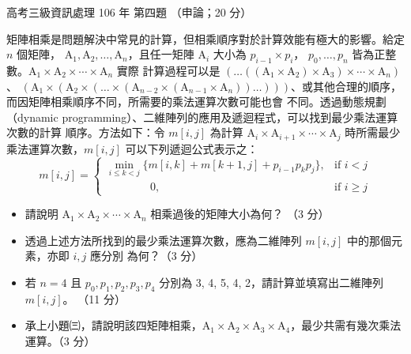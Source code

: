\begin{pastexam}[label={px:gk3-106-ds-04}]{高考三級資訊處理 106 年 第四題}
（申論；20 分）

矩陣相乘是問題解決中常見的計算，但相乘順序對於計算效能有極大的影響。給定 $n$ 個矩陣，
$\mathrm{A}_1, \mathrm{A}_2, \ldots, \mathrm{A}_n$，且任一矩陣 $\mathrm{A}_i$ 大小為 $p_{i-1} \times p_i$，
$p_0, \ldots, p_n$ 皆為正整數。$\mathrm{A}_1 \times \mathrm{A}_2 \times \cdots \times \mathrm{A}_n$ 實際
計算過程可以是
$(\ldots((\mathrm{A}_1 \times \mathrm{A}_2) \times \mathrm{A}_3) \times \cdots \times \mathrm{A}_n)$、
$(\mathrm{A}_1 \times (\mathrm{A}_2 \times (\ldots \times (\mathrm{A}_{n-2} \times (\mathrm{A}_{n-1}
\times \mathrm{A}_n))\ldots)))$、或其他合理的順序，而因矩陣相乘順序不同，所需要的乘法運算次數可能也會
不同。透過動態規劃（dynamic programming）、二維陣列的應用及遞迴程式，可以找到最少乘法運算次數的計算
順序。方法如下：令 $m[i, j]$ 為計算 $\mathrm{A}_i \times \mathrm{A}_{i+1} \times \cdots \times
\mathrm{A}_j$ 時所需最少乘法運算次數，$m[i, j]$ 可以下列遞迴公式表示之：
\[
m[i, j] = \begin{cases}
\displaystyle\min_{i \le k < j} \{m[i, k] + m[k+1, j] + p_{i-1} p_k p_j\}, & \text{if } i < j \\[4pt]
\qquad\qquad 0, & \text{if } i \ge j
\end{cases}
\]
\begin{itemize}[leftmargin=2.2em]
\item[㈠] 請說明 $\mathrm{A}_1 \times \mathrm{A}_2 \times \cdots \times \mathrm{A}_n$ 相乘過後的矩陣大小為何？
（3 分）
\item[㈡] 透過上述方法所找到的最少乘法運算次數，應為二維陣列 $m[i, j]$ 中的那個元素，亦即 $i, j$ 應分別
為何？（3 分）
\item[㈢] 若 $n = 4$ 且 $p_0, p_1, p_2, p_3, p_4$ 分別為 3, 4, 5, 4, 2，請計算並填寫出二維陣列 $m[i, j]$。
（11 分）
\item[㈣] 承上小題㈢，請說明該四矩陣相乘，$\mathrm{A}_1 \times \mathrm{A}_2 \times \mathrm{A}_3 \times
\mathrm{A}_4$，最少共需有幾次乘法運算。（3 分）
\end{itemize}
\end{pastexam}

